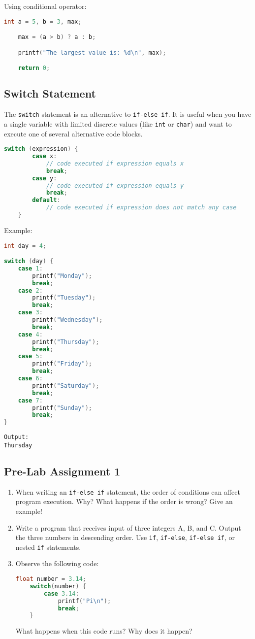 Using conditional operator:
\begin{lstlisting}[language=c]
	int a = 5, b = 3, max;

	max = (a > b) ? a : b;

	printf("The largest value is: %d\n", max);

	return 0;
\end{lstlisting}

\subsection{Switch Statement}

The \verb|switch| statement is an alternative to \verb|if-else if|.  
It is useful when you have a single variable with limited discrete values (like \verb|int| or \verb|char|) and want to execute one of several alternative code blocks.

{
\captionsetup[lstlisting]{labelformat=empty, justification=raggedright, singlelinecheck=false}
\begin{lstlisting}[language=c, caption={Syntax}]
	switch (expression) {
		case x:
			// code executed if expression equals x
			break;
		case y:
			// code executed if expression equals y
			break;
		default:
			// code executed if expression does not match any case
	}
\end{lstlisting}
}

Example:
\begin{lstlisting}[language=c]
int day = 4;

switch (day) {
	case 1:
		printf("Monday");
		break;
	case 2:
		printf("Tuesday");
		break;
	case 3:
		printf("Wednesday");
		break;
	case 4:
		printf("Thursday");
		break;
	case 5:
		printf("Friday");
		break;
	case 6:
		printf("Saturday");
		break;
	case 7:
		printf("Sunday");
		break;
}
\end{lstlisting}
\begin{verbatim}
Output:
Thursday
\end{verbatim}

\subsection*{Pre-Lab Assignment 1}
\begin{enumerate}
    \item When writing an \verb|if-else if| statement, the order of conditions can affect program execution. Why? What happens if the order is wrong? Give an example!
    \item Write a program that receives input of three integers A, B, and C. Output the three numbers in descending order. Use \verb|if|, \verb|if-else|, \verb|if-else if|, or nested \verb|if| statements.
    \item Observe the following code:
    \begin{lstlisting}[language=c]
	float number = 3.14;
	switch(number) {
		case 3.14:
			printf("Pi\n");
			break;
	}
\end{lstlisting}
    What happens when this code runs? Why does it happen?
\end{enumerate}

